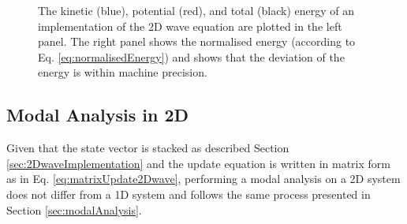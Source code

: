 \begin{figure}[h]
    \centering
      \caption{The kinetic (blue), potential (red), and total (black) energy of an implementation of the 2D wave equation are plotted in the left panel. The right panel shows the normalised energy (according to Eq. \eqref{eq:normalisedEnergy}) and shows that the deviation of the energy is within machine precision. \label{fig:energy2Dwave}}
\end{figure}

\subsection{Modal Analysis in 2D}
Given that the state vector is stacked as described Section \ref{sec:2DwaveImplementation} and the update equation is written in matrix form as in Eq. \eqref{eq:matrixUpdate2Dwave}, performing a modal analysis on a 2D system does not differ from a 1D system and follows the same process presented in Section \ref{sec:modalAnalysis}.

